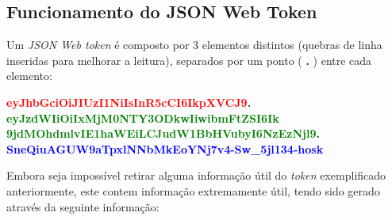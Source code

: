 \cleardoublepage
\subsection{Funcionamento do JSON Web Token}

Um \emph{JSON Web token} é composto por 3 elementos distintos (quebras de linha inseridas para melhorar a leitura), separados por um ponto (\textbf{ . }) entre cada elemento:

\begin{center}
    \textbf{\textcolor{red}{eyJhbGciOiJIUzI1NiIsInR5cCI6IkpXVCJ9}.\\
    \textcolor{green}{eyJzdWIiOiIxMjM0NTY3ODkwIiwibmFtZSI6Ik\\9jdMOhdmlvIE1haWEiLCJudW1BbHVubyI6NzEzNjl9}.\\
    \textcolor{blue}{SneQiuAGUW9aTpxlNNbMkEoYNj7v4-Sw\_5jl134-hosk}}
\end{center}

Embora seja impossível retirar alguma informação útil do \emph{token} exemplificado anteriormente, este contem informação extremamente útil, tendo sido gerado através da seguinte informação:

